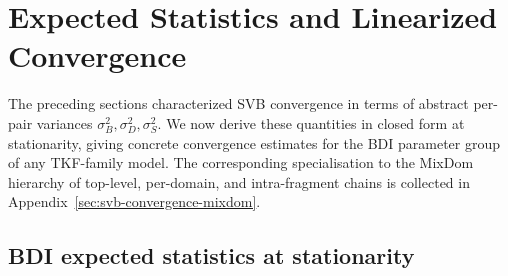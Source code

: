 
\section{Expected Statistics and Linearized Convergence}
\label{sec:expected-stats}

The preceding sections characterized SVB convergence in terms of
abstract per-pair variances $\sigma^2_B, \sigma^2_D, \sigma^2_S$.
We now derive these quantities in closed form at stationarity,
giving concrete convergence estimates for the BDI parameter group
of any TKF-family model.\ifdefined\MIXDOMPAPER{}  The corresponding
specialisation to the MixDom hierarchy of top-level, per-domain, and
intra-fragment chains is collected in
Appendix~\ref{sec:svb-convergence-mixdom}.\fi

\subsection{BDI expected statistics at stationarity}

